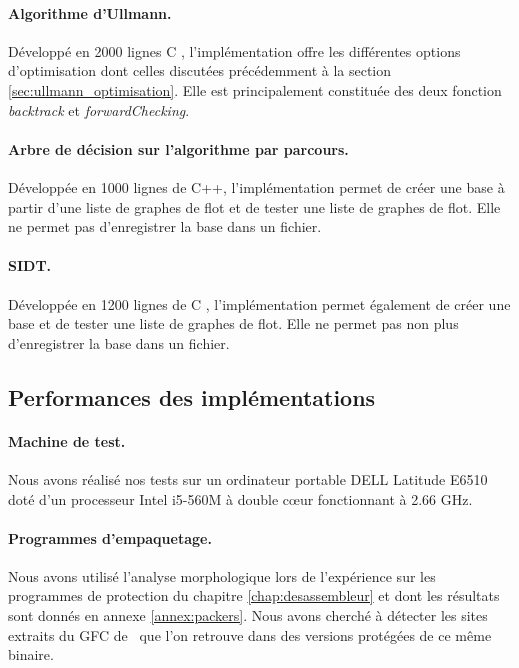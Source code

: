 \paragraph{Algorithme d'Ullmann.}
Développé en 2000 lignes C \cite{graphbinalgo}, l'implémentation offre les différentes options d'optimisation dont celles discutées précédemment à la section \ref{sec:ullmann_optimisation}.
Elle est principalement constituée des deux fonction \emph{backtrack} et \emph{forwardChecking}.

\paragraph{Arbre de décision sur l'algorithme par parcours.}
Développée en 1000 lignes de C++, l'implémentation permet de créer une base à partir d'une liste de graphes de flot et de tester une liste de graphes de flot. Elle ne permet pas d'enregistrer la base dans un fichier.

\paragraph{SIDT.}
Développée en 1200 lignes de C \cite{SIDT}, l'implémentation permet également de créer une base et de tester une liste de graphes de flot. Elle ne permet pas non plus d'enregistrer la base dans un fichier.


\subsection{Performances des implémentations}
\paragraph{Machine de test.}
Nous avons réalisé nos tests sur un ordinateur portable DELL Latitude E6510 doté d'un processeur Intel i5-560M à double c\oe ur fonctionnant à 2.66 GHz.

\paragraph{Programmes d'empaquetage.}
Nous avons utilisé l'analyse morphologique lors de l'expérience sur les programmes de protection du chapitre \ref{chap:desassembleur} et dont les résultats sont donnés en annexe \ref{annex:packers}.
Nous avons cherché à détecter les sites extraits du GFC de \hostname\ que l'on retrouve dans des versions protégées de ce même binaire.

